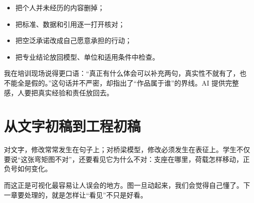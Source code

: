 \begin{itemize}
  \item 把个人并未经历的内容删掉；
  \item 把标准、数据和引用逐一打开核对；
  \item 把空泛承诺改成自己愿意承担的行动；
  \item 把专业结论放回模型、单位和适用条件中检查。
\end{itemize}

我在培训现场说得更口语：``真正有什么体会可以补充两句，真实性不就有了，也不能全是假的。''这句话并不严密，却指出了“作品属于谁”的界线。AI 提供完整感，人要把真实经验和责任放回去。

\section{从文字初稿到工程初稿}

对文字，修改常常发生在句子上；对桥梁模型，修改必须发生在表征上。学生不仅要说“这张弯矩图不对”，还要看见它为什么不对：支座在哪里，荷载怎样移动，正负号如何变化。

而这正是可视化最容易让人误会的地方。图一旦动起来，我们会觉得自己懂了。下一章要处理的，就是怎样让“看见”不只是好看。
